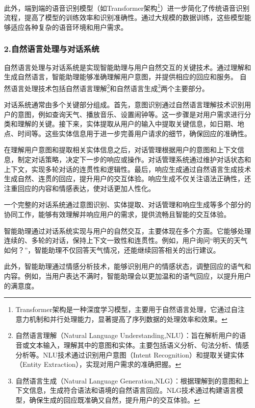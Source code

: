 此外，端到端的语音识别模型（如Transformer架构\footnote{Transformer架构是一种深度学习模型，主要用于自然语言处理，它通过自注意力机制和并行处理能力，显著提高了序列数据的处理效率和效果。}）进一步简化了传统语音识别流程，提高了模型的训练效率和识别准确性。通过大规模的数据训练，这些模型能够适应各种复杂的语音环境和用户需求。

\subsubsection{2.自然语言处理与对话系统}

自然语言处理与对话系统是实现智能助理与用户自然交互的关键技术。通过理解和生成自然语言，智能助理能够准确理解用户意图，并提供相应的回应和服务。
自然语言处理技术包括自然语言理解\footnote{自然语言理解（Natural Language Understanding,NLU）：旨在解析用户的语音或文本输入，理解其中的意图和实体。主要包括语义分析、句法分析、情感分析等。NLU技术通过识别用户意图（Intent Recognition）和提取关键实体（Entity Extraction），实现对用户需求的准确把握。}和自然语言生成\footnote{自然语言生成（Natural Language Generation,NLG）：根据理解到的意图和上下文信息，生成符合语法和语境的自然语言回应。NLG技术通过构建语言模型，确保生成的回应既准确又自然，提升用户的交互体验。}两个主要部分。

对话系统通常由多个关键部分组成。首先，意图识别通过自然语言理解技术识别用户的意图，例如查询天气、播放音乐、设置闹钟等。这一步骤是对用户需求进行分类和理解的关键。接下来，实体提取从用户的输入中提取关键信息，如日期、地点、时间等。这些实体信息用于进一步完善用户请求的细节，确保回应的准确性。

在理解用户意图和提取相关实体信息之后，对话管理根据用户的意图和上下文信息，制定对话策略，决定下一步的响应或操作。对话管理系统通过维护对话状态和上下文，实现多轮对话的连贯性和逻辑性。最后，响应生成通过自然语言生成技术生成自然、连贯的回应，提升用户的交互体验。响应生成不仅关注语法正确性，还注重回应的内容和情感表达，使对话更加人性化。

一个完整的对话系统通过意图识别、实体提取、对话管理和响应生成等多个部分的协同工作，能够有效理解并响应用户的需求，提供流畅且智能的交互体验。

智能助理通过对话系统实现与用户的自然交互，主要体现在多个方面。它能够处理连续的、多轮的对话，保持上下文一致性和连贯性。例如，用户询问“明天的天气如何？”，智能助理不仅回答天气情况，还能继续回答相关的出行建议。

此外，智能助理通过情感分析技术，能够识别用户的情感状态，调整回应的语气和内容。例如，当用户表达不满时，智能助理会以更加温和的语气回应，以提升用户的满意度。

